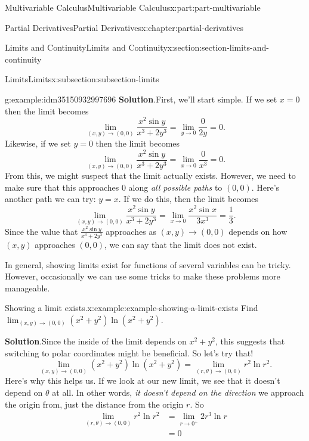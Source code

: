 \documentclass[twoside,10pt,]{tufte-book}
\newcommand{\blocktitlefont}{\relax}
\numberwithin{equation}{part}
\begin{document}
\begin{partptx}{Multivariable Calculus}{}{Multivariable Calculus}{}{}{x:part:part-multivariable}
\begin{chapterptx}{Partial Derivatives}{}{Partial Derivatives}{}{}{x:chapter:partial-derivatives}
\begin{sectionptx}{Limits and Continuity}{}{Limits and Continuity}{}{}{x:section:section-limits-and-continuity}
\begin{subsectionptx}{Limits}{}{Limits}{}{}{x:subsection:subsection-limits}
\begin{example}{}{g:example:idm35150932997696}
\noindent\textbf{\blocktitlefont Solution}.\hypertarget{g:solution:idm35150932996800}{}\quad{}First, we'll start simple. If we set \(x = 0\) then the limit becomes%
\begin{equation*}
\lim_{(x,y)\to(0,0)}\frac{x^{2}\sin y}{x^{3}+2y^{3}} = \lim_{y\to0}\frac{0}{2y} = 0.
\end{equation*}
Likewise, if we set \(y=0\) then the limit becomes%
\begin{equation*}
\lim_{(x,y)\to(0,0)}\frac{x^{2}\sin y}{x^{3}+2y^{3}} = \lim_{x\to0}\frac{0}{x^{3}} = 0.
\end{equation*}
From this, we might suspect that the limit actually exists. However, we need to make sure that this approaches \(0\) along \emph{all possible paths} to \((0,0)\). Here's another path we can try: \(y = x\). If we do this, then the limit becomes%
\begin{equation*}
\lim_{(x,y)\to(0,0)}\frac{x^{2}\sin y}{x^{3}+2y^{3}} = \lim_{x\to0}\frac{x^{2}\sin x}{3x^{3}} = \frac{1}{3}.
\end{equation*}
Since the value that \(\frac{x^{2}\sin y}{x^{3}+2y^{3}}\) approaches as \((x,y)\to(0,0)\) depends on how \((x,y)\) approaches \((0,0)\), we can say that the limit does not exist.%
\end{example}
In general, showing limits exist for functions of several variables can be tricky. However, occasionally we can use some tricks to make these problems more manageable.%
\begin{example}{Showing a limit exists.}{x:example:example-showing-a-limit-exists}%
Find \(\lim_{(x,y)\to(0,0)}(x^{2}+y^{2})\ln(x^{2}+y^{2})\).%
\par\smallskip%
\noindent\textbf{\blocktitlefont Solution}.\hypertarget{g:solution:idm35150932989760}{}\quad{}Since the inside of the limit depends on \(x^{2}+y^{2}\), this suggests that switching to polar coordinates might be beneficial. So let's try that!%
\begin{equation*}
\lim_{(x,y)\to(0,0)}(x^{2}+y^{2})\ln(x^{2}+y^{2}) = \lim_{(r,\theta)\to(0,0)}r^{2}\ln r^{2}.
\end{equation*}
Here's why this helps us. If we look at our new limit, we see that it doesn't depend on \(\theta\) at all. In other words, \emph{it doesn't depend on the direction} we approach the origin from, just the distance from the origin \(r\). So%
\begin{align*}
\lim_{(r,\theta)\to(0,0)}r^{2}\ln r^{2} & = \lim_{r\to0^{+}} 2r^{3}\ln r \\
& = 0 
\end{align*}

\end{example}
\end{subsectionptx}
\end{sectionptx}
\end{chapterptx}
\end{partptx}
\end{document}

